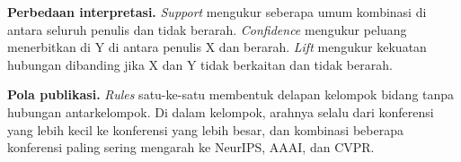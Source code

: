\textbf{Perbedaan interpretasi.} \textit{Support} mengukur seberapa umum kombinasi di antara seluruh penulis dan tidak berarah. \textit{Confidence} mengukur peluang menerbitkan di Y di antara penulis X dan berarah. \textit{Lift} mengukur kekuatan hubungan dibanding jika X dan Y tidak berkaitan dan tidak berarah.

\textbf{Pola publikasi.} \textit{Rules} satu-ke-satu membentuk delapan kelompok bidang tanpa hubungan antarkelompok. Di dalam kelompok, arahnya selalu dari konferensi yang lebih kecil ke konferensi yang lebih besar, dan kombinasi beberapa konferensi paling sering mengarah ke NeurIPS, AAAI, dan CVPR.
